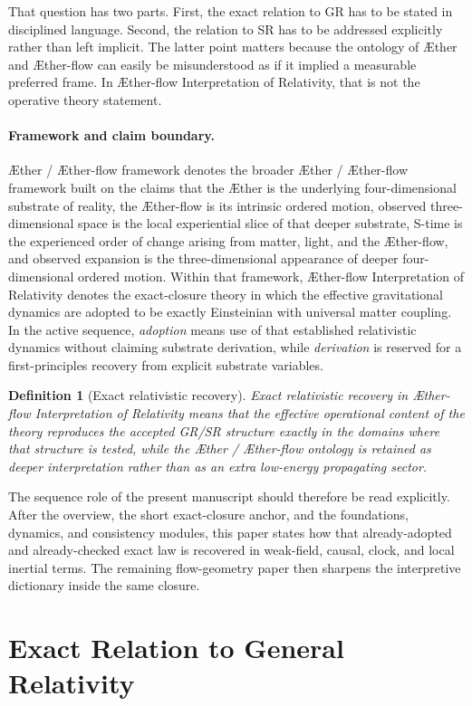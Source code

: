 \documentclass[11pt]{article}
\newcommand{\Aether}{\AE{}ther}
\newcommand{\Aflow}{\AE{}ther-flow}
\newcommand{\TheoryName}{\Aflow{} Interpretation of Relativity}
\newcommand{\TheoryProgram}{\Aether{} / \Aflow{} framework}
\newtheorem{definition}{Definition}
\begin{document}
That question has two parts. First, the exact relation to GR has to be stated in disciplined language. Second, the relation to SR has to be addressed explicitly rather than left implicit. The latter point matters because the ontology of \Aether{} and \Aflow{} can easily be misunderstood as if it implied a measurable preferred frame. In \TheoryName{}, that is not the operative theory statement.

\paragraph{Framework and claim boundary.}
\TheoryProgram{} denotes the broader \Aether{} / \Aflow{} framework built on the claims that the \Aether{} is the underlying four-dimensional substrate of reality, the \Aflow{} is its intrinsic ordered motion, observed three-dimensional space is the local experiential slice of that deeper substrate, S-time is the experienced order of change arising from matter, light, and the \Aflow{}, and observed expansion is the three-dimensional appearance of deeper four-dimensional ordered motion. Within that framework, \TheoryName{} denotes the exact-closure theory in which the effective gravitational dynamics are adopted to be exactly Einsteinian with universal matter coupling. In the active sequence, \emph{adoption} means use of that established relativistic dynamics without claiming substrate derivation, while \emph{derivation} is reserved for a first-principles recovery from explicit substrate variables.

\begin{definition}[Exact relativistic recovery]
Exact relativistic recovery in \TheoryName{} means that the effective operational content of the theory reproduces the accepted GR/SR structure exactly in the domains where that structure is tested, while the \Aether{} / \Aflow{} ontology is retained as deeper interpretation rather than as an extra low-energy propagating sector.
\end{definition}

The sequence role of the present manuscript should therefore be read explicitly. After the overview, the short exact-closure anchor, and the foundations, dynamics, and consistency modules, this paper states how that already-adopted and already-checked exact law is recovered in weak-field, causal, clock, and local inertial terms. The remaining flow-geometry paper then sharpens the interpretive dictionary inside the same closure.

\section{Exact Relation to General Relativity}
\end{document}
